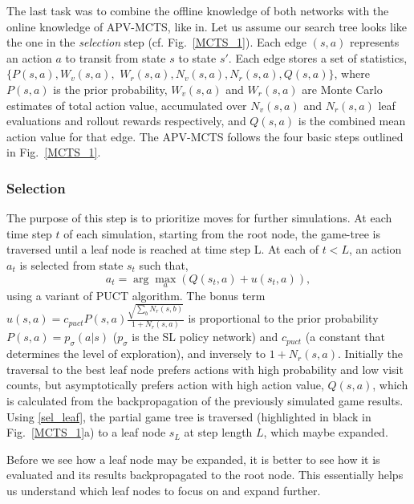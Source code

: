 The last task was to combine the offline knowledge of both networks with the online knowledge of APV-MCTS, like in\cite{b26}. Let us assume our search tree looks like the one in the \textit{selection} step (cf. Fig.~\ref{MCTS_1}). Each edge $(s, a)$ represents an action $a$ to transit from state $s$ to state $s'$. Each edge stores a set of statistics, $\{ P(s,a), W_v(s,a),$ $W_r(s,a), N_v(s,a), N_r(s,a), Q(s,a)\}$, where $P(s,a)$ is the prior probability, $W_v(s,a)$ and $W_r(s,a)$ are Monte Carlo estimates of total action value, accumulated over $N_v(s,a)$ and $N_r(s,a)$ leaf evaluations and rollout rewards respectively, and $Q(s,a)$ is the combined mean action value for that edge. The APV-MCTS follows the four basic steps outlined in Fig.~\ref{MCTS_1}.

\subsubsection*{Selection} The purpose of this step is to prioritize moves for further simulations. At each time step $t$ of each simulation, starting from the root node, the game-tree is traversed until a leaf node is reached at time step L. At each of $t<L$, an action $a_t$ is selected from state $s_t$ such that,
\begin{equation}\label{sel_leaf}
    a_t = \arg\max_a( Q(s_t,a) + u(s_t,a)),
\end{equation}
 using a variant of PUCT algorithm\cite{b27, b28}. The bonus term $u(s,a) = c_{puct} P(s,a) \frac{\sqrt{\sum_b N_r(s,b)}}{1+N_r(s,a)}$ is proportional to the prior probability $P(s,a) = p_\sigma(a|s)$ ($p_\sigma$ is the SL policy network) and $c_{puct}$ (a constant that determines the level of exploration), and inversely to $1+N_r(s,a)$. Initially the traversal to the best leaf node prefers actions with high probability and low visit counts, but asymptotically prefers action with high action value, $Q(s,a)$, which is calculated from the backpropagation of the previously simulated game results. Using \eqref{sel_leaf}, the partial game tree is traversed (highlighted in black in Fig.~\ref{MCTS_1}a) to a leaf node $s_L$ at step length $L$, which maybe expanded.
 
 Before we see how a leaf node may be expanded, it is better to see how it is evaluated and its results backpropagated to the root node. This essentially helps us understand which leaf nodes to focus on and expand further.

